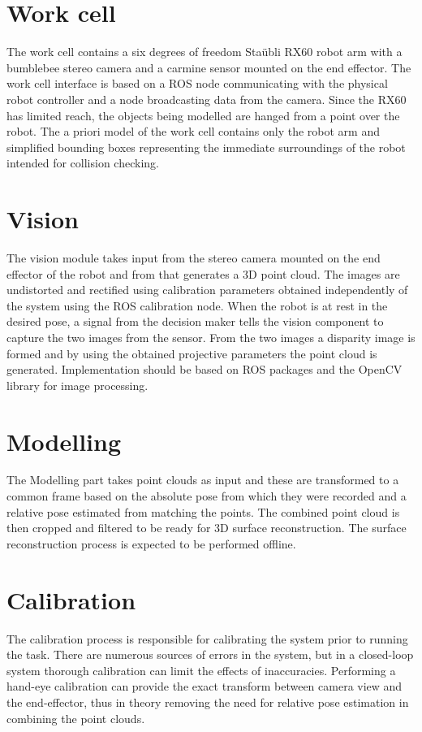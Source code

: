 \section{Work cell}
The work cell contains a six degrees of freedom Staübli RX60 robot arm with a bumblebee stereo camera and a carmine sensor mounted on the end effector. The work cell interface is based on a ROS node communicating with the physical robot controller and a node broadcasting data from the camera. Since the RX60 has limited reach, the objects being modelled are hanged from a point over the robot. The a priori model of the work cell contains only the robot arm and simplified bounding boxes representing the immediate surroundings of the robot intended for collision checking. 

\section{Vision}
The vision module takes input from the stereo camera mounted on the end effector of the robot and from that generates a 3D point cloud. The images are undistorted and rectified using calibration parameters obtained independently of the system using the ROS calibration node. When the robot is at rest in the desired pose, a signal from the decision maker tells the vision component to capture the two images from the sensor. From the two images a disparity image is formed and by using the obtained projective parameters the point cloud is generated. Implementation should be based on ROS packages and the OpenCV library for image processing.

\section{Modelling}
The Modelling part takes point clouds as input and these are transformed to a common frame based on the absolute pose from which they were recorded and a relative pose estimated from matching the points. The combined point cloud is then cropped and filtered to be ready for 3D surface reconstruction. The surface reconstruction process is expected to be performed offline.

\section{Calibration}
The calibration process is responsible for calibrating the system prior to running the task. There are numerous sources of errors in the system, but in a closed-loop system thorough calibration can limit the effects of inaccuracies. Performing a hand-eye calibration can provide the exact transform between camera view and the end-effector, thus in theory removing the need for relative pose estimation in combining the point clouds.


